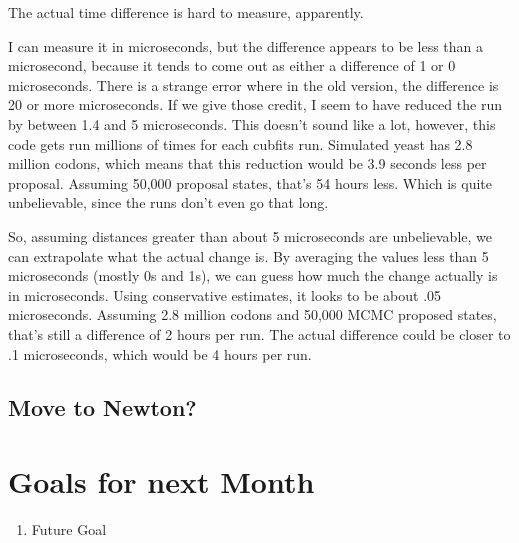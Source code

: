 The actual time difference is hard to measure, apparently.

I can measure it in microseconds, but the difference appears to be less than a microsecond, because it tends to come out as either a difference of 1 or 0 microseconds. There is a strange error where in the old version, the difference is 20 or more microseconds. If we give those credit, I seem to have reduced the run by between 1.4 and 5 microseconds. This doesn't sound like a lot, however, this code gets run millions of times for each cubfits run. Simulated yeast has 2.8 million codons, which means that this reduction would be 3.9 seconds less per proposal. Assuming 50,000 proposal states, that's 54 hours less. Which is quite unbelievable, since the runs don't even go that long.

So, assuming distances greater than about 5 microseconds are unbelievable, we can extrapolate what the actual change is. By averaging the values less than 5 microseconds (mostly 0s and 1s), we can guess how much the change actually is in microseconds. Using conservative estimates, it looks to be about .05 microseconds. Assuming 2.8 million codons and 50,000 MCMC proposed states, that's still a difference of 2 hours per run. The actual difference could be closer to .1 microseconds, which would be 4 hours per run.

\subsection{Move to Newton?}


\section{Goals for next Month}
\begin{enumerate}
\item Future Goal
\end{enumerate}



